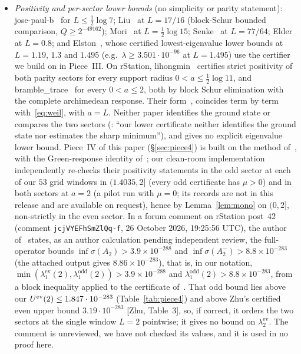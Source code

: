 \documentclass[11pt]{amsart}
\newcommand{\ev}{\mathrm{ev}}
\newcommand{\od}{\mathrm{odd}}
\newcommand{\e}[1]{\cdot 10^{#1}}
\theoremstyle{definition}
\theoremstyle{remark}
\numberwithin{equation}{section}
\begin{document}
\begin{itemize}
\item \emph{Positivity and per-sector lower bounds} (no simplicity or parity statement): jose-paul-b~\cite{JPB} for $L\le\tfrac12\log7$; Liu~\cite{Liu} at $L=17/16$ (block-Schur bounded comparison, $Q\ge2^{-49162}$); Mori~\cite{Mori} at $L=\tfrac12\log15$; Senke~\cite{Senke} at $L=77/64$; Elder~\cite{Elder} at $L=0.8$; and Elston~\cite{Elston}, whose certified lowest-eigenvalue lower bounds at $L=1.19$, $1.3$ and $1.495$ (e.g.\ $\lambda\ge3.501\e{-96}$ at $L=1.495$) use the certifier we build on in Piece~III. On rStation, lihongmin~\cite[Thm.~1.1]{rh45} certifies strict positivity of both parity sectors for every support radius $0<a\le\tfrac12\log11$, and bramble\_trace~\cite[Thm.~1.1]{rh60} for every $0<a\le2$, both by block Schur elimination with the complete archimedean response. Their form~\cite[(2.1)]{rh45}, \cite[(2.1)]{rh60} coincides term by term with~\eqref{eq:weil}, with $a=L$. Neither paper identifies the ground state or compares the two sectors (\cite[\S1]{rh45}: ``our lower certificate neither identifies the ground state nor estimates the sharp minimum''), and \cite{rh60} gives no explicit eigenvalue lower bound. Piece~IV of this paper (\S\ref{sec:piece4}) is built on the method of~\cite{rh60}, with the Green-response identity of~\cite{rh45}; our clean-room implementation independently re-checks their positivity statements in the odd sector at each of our $53$ grid windows in $(1.4035,2]$ (every odd certificate has $\mu>0$) and in both sectors at $a=2$ (a pilot run with $\mu=0$; its records are not in this release and are available on request), hence by Lemma~\ref{lem:mono} on $(0,2]$, non-strictly in the even sector. In a forum comment on rStation post~42~\cite{rh60gap} (comment \texttt{jcjVYEFhSmZlQq-f}, 26 October 2026, 19:25:56 UTC), the author of~\cite{rh60} states, as an author calculation pending independent review, the full-operator bounds $\inf\sigma(A_2)>3.9\times10^{-288}$ and $\inf\sigma(A_2^-)>8.8\times10^{-283}$ (the attached output gives $8.86\times10^{-283}$), that is, in our notation, $\min(\lambda_1^\ev(2),\lambda_1^\od(2))>3.9\times10^{-288}$ and $\lambda_1^\od(2)>8.8\times10^{-283}$, from a block inequality applied to the certificate of~\cite{rh60}. That odd bound lies above our $U^\ev(2)\le\PIVUTwo$ (Table~\ref{tab:piece4}) and above Zhu's certified even upper bound $3.19\e{-283}$ [Zhu, Table~3], so, if correct, it orders the two sectors at the single window $L=2$ pointwise; it gives no bound on $\lambda_2^\ev$. The comment is unreviewed, we have not checked its values, and it is used in no proof here.

\end{itemize}
\end{document}
